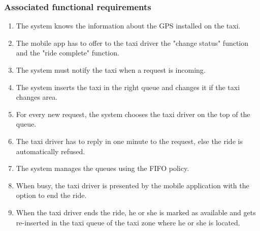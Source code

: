 \subsubsection{Associated functional requirements}
\begin{enumerate}
\item The system knows the information about the GPS installed on the taxi.
\item The mobile app has to offer to the taxi driver the "change status" function and the "ride complete" function.
\item The system must notify the taxi when a request is incoming.
\item The system inserts the taxi in the right queue and changes it if the taxi changes area.
\item For every new request, the system chooses the taxi driver on the top of the queue.
\item The taxi driver has to reply in one minute to the request, else the ride is automatically refused.
\item The system manages the queues using the FIFO policy.
\item When busy, the taxi driver is presented by the mobile application with the option to end the ride.
\item When the taxi driver ends the ride, he or she is marked as available and gets re-inserted in the taxi queue of the taxi zone where he or she is located.
\end{enumerate}

